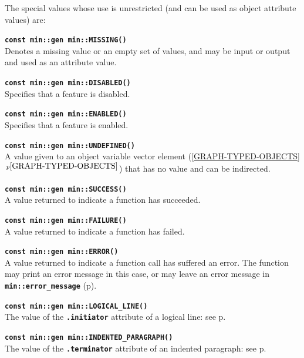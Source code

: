 \documentclass[12pt]{article}
\makeatletter
\newcommand{\TT}[1]{{\tt \bfseries #1}}
\newcommand{\ttindex}[1]{\index{#1@{\tt #1}}}
\newcommand{\itemref}[1]{\ref{#1}$\,^{p\pageref{#1}}$}
\newcommand{\pagref}[1]{p\pageref{#1}}
\newcommand{\EOL}{\penalty \exhyphenpenalty}
\newenvironment{indpar}[1][0.3in]%
	{\begin{list}{}%
		     {\setlength{\itemsep}{0in}%
		      \setlength{\topsep}{0in}%
		      \setlength{\parsep}{1ex}%
		      \setlength{\labelwidth}{#1}%
		      \setlength{\leftmargin}{#1}%
		      \addtolength{\leftmargin}{\labelsep}}%
	 \item}%
	{\end{list}}
\newcommand{\LABEL}[1]{\label{#1}}
\newcommand{\MINKEY}[1]%
	   {\TT{#1}\ttindex{min::#1}\ttindex{#1}}
\makeatother
\begin{document}
The special values whose use is unrestricted
(and can be used as object attribute values) are:

\begin{indpar}
\begin{list}{}{}
\item[\TT{const min::gen min::}\MINKEY{MISSING()}]~%
	\LABEL{MIN::MISSING}\\
Denotes a missing value or an empty set of values, and may be input
or output and used as an attribute value.
\item[\TT{const min::gen min::}\MINKEY{DISABLED()}]~%
	\LABEL{MIN::DISABLED}\\
Specifies that a feature is disabled.
\item[\TT{const min::gen min::}\MINKEY{ENABLED()}]~%
	\LABEL{MIN::ENABLED}\\
Specifies that a feature is enabled.
\item[\TT{const min::gen min::}\MINKEY{UNDEFINED()}]~%
	\LABEL{MIN::UNDEFINED}\\
A value given to an object variable vector element
(\itemref{GRAPH-TYPED-OBJECTS}) that has no value and can be indirected.
\item[\TT{const min::gen min::}\MINKEY{SUCCESS()}]~%
	\LABEL{MIN::SUCCESS}\\
A value returned to indicate a function has succeeded.
\item[\TT{const min::gen min::}\MINKEY{FAILURE()}]~%
	\LABEL{MIN::FAILURE}\\
A value returned to indicate a function has failed.
\item[\TT{const min::gen min::}\MINKEY{ERROR()}]~%
	\LABEL{MIN::ERROR}\\
A value returned to indicate a function call has suffered an error.
The function may print an error message in
this case, or may leave an error message in
\TT{min::\EOL error\_\EOL message} (\pagref{ERROR_MESSAGE}).
\item[\TT{const min::gen min::}\MINKEY{LOGICAL\_LINE()}]~%
	\LABEL{MIN::LOGICAL_LINE}\\
The value of the \TT{.initiator} attribute of a logical line:
see \pagref{LOGICAL-LINE-COMPACT-FORMAT}.
\item[\TT{const min::gen min::}\MINKEY{INDENTED\_PARAGRAPH()}]~%
	\LABEL{MIN::INDENTED_PARAGRAPH}\\
The value of the \TT{.terminator} attribute of an indented paragraph:
see \pagref{INDENTED-PARAGRAPH-COMPACT-FORMAT}.
\end{list}
\end{indpar}
\end{document}
